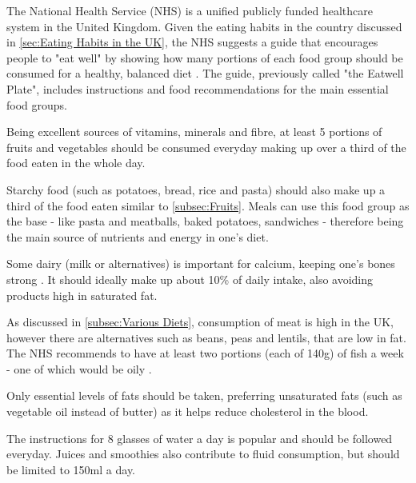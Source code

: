 \documentclass[../main.tex]{subfiles}
\begin{document}
The National Health Service (NHS) is a unified publicly funded healthcare system in the United Kingdom. Given the eating habits in the country discussed in \ref{sec:Eating Habits in the UK}, the NHS suggests a guide that encourages people to "eat well" by showing how many portions of each food group should be consumed for a healthy, balanced diet \cite{EatwellGuide, EatwellGuide2018}. The guide, previously called "the Eatwell Plate", includes instructions and food recommendations for the main essential food groups.


Being excellent sources of vitamins, minerals and fibre, at least 5 portions of fruits and vegetables \cite{DayWhatCounts2018} should be consumed everyday making up over a third of the food eaten in the whole day.


Starchy food (such as potatoes, bread, rice and pasta) should also make up a third of the food eaten similar to \ref{subsec:Fruits}. Meals can use this food group as the base - like pasta and meatballs, baked potatoes, sandwiches - therefore being the main source of nutrients and energy in one's diet. \cite{StarchyFoodsCarbohydrates2018}


Some dairy (milk or alternatives) is important for calcium, keeping one's bones strong \cite{DairyAlternativesYour2018}. It should ideally make up about 10\% of daily intake, also avoiding products high in saturated fat.


As discussed in \ref{subsec:Various Diets}, consumption of meat is high in the UK, however there are alternatives such as beans, peas and lentils, that are low in fat. The NHS recommends to have at least two portions (each of 140g) of fish a week - one of which would be oily \cite{EatwellGuide2018}.


Only essential levels of fats should be taken, preferring unsaturated fats (such as vegetable oil instead of butter) as it helps reduce cholesterol in the blood.


The instructions for 8 glasses of water a day is popular and should be followed everyday. Juices and smoothies also contribute to fluid consumption, but should be limited to 150ml a day. \cite{WaterDrinksYour2018}
\end{document}
